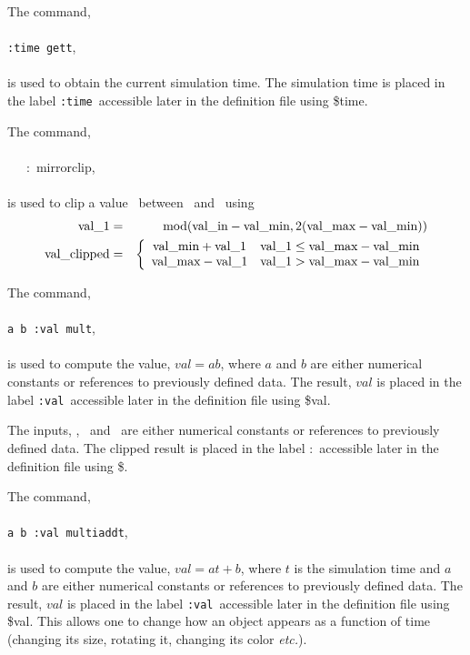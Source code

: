 \documentclass[11pt,twoside]{book}
\newcommand{\hitem}[1]{\item[{\bf #1} \hfill]}
\begin{document}
\hitem{GETT}
The command, \\
\\
{\tt :time gett}, \\
\\
is used to obtain the current simulation time.  The simulation time
is placed
in the label {\tt :time}\ accessible later in the definition file using \$time.

\hitem{MIRRORCLIP}
The command, \\
\\
\valin\ \valmin\ \valmax\ :\valclipped\ mirrorclip, \\
\\
is used to clip a value \valin\ between \valmin\
and \valmax\ using
\begin{eqnarray*}
{\tt \mbox{val\_1}}&=&\mbox{mod}( {\tt \mbox{val\_in}}-{\tt \mbox{val\_min}},2({\tt \mbox{val\_max}}-{\tt \mbox{val\_min}}) )\\
{\tt \mbox{val\_clipped}}&=&\left\{
\begin{array}{cc}
  {\tt \mbox{val\_min}}+{\tt \mbox{val\_1}} & {\tt \mbox{val\_1}}\le {\tt \mbox{val\_max}}-{\tt \mbox{val\_min}} \\
  {\tt \mbox{val\_max}}-{\tt \mbox{val\_1}} & {\tt \mbox{val\_1}}> {\tt \mbox{val\_max}}-{\tt \mbox{val\_min}}
\end{array}
\right.
\end{eqnarray*}

\hitem{MULT}
The command, \\
\\
{\tt a b :val mult}, \\
\\
is used to compute the value, $val=ab$, where $a$ and $b$ are either numerical constants or references to previously defined data.  The result, $val$ is placed
in the label {\tt :val}\ accessible later in the definition file using \$val.

\noindent The inputs, \valin, \valmin\ and \valmax\ are either numerical constants or references to previously defined data.  The clipped result is placed
in the label :\valclipped\ accessible later in the definition file using \$\valclipped.

\hitem{MULTIADDT}
The command, \\
\\
{\tt a b :val multiaddt}, \\
\\
is used to compute the value, $val=at+b$, where $t$ is the simulation time and
$a$ and $b$ are either numerical constants or references to previously defined data. The result, $val$ is placed
in the label {\tt :val}\ accessible later in the definition file using \$val.  This allows one to change how an object
appears as a function of time (changing its size, rotating it, changing its color {\em etc.}).
\end{document}

